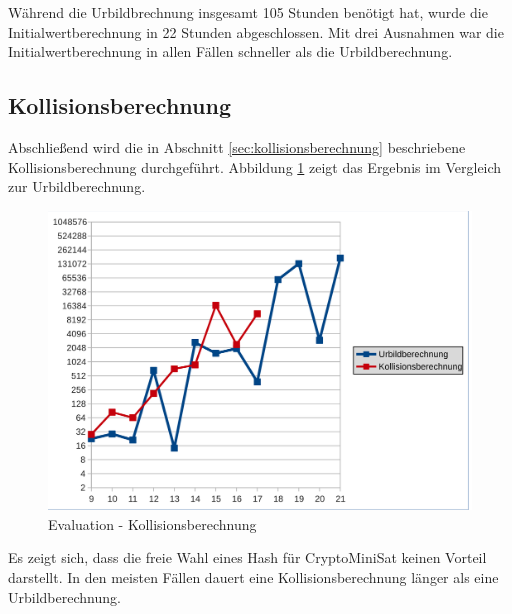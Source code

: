 Während die Urbildbrechnung insgesamt 105 Stunden benötigt hat, wurde die Initialwertberechnung in 22 Stunden
abgeschlossen. Mit drei Ausnahmen war die Initialwertberechnung in allen Fällen schneller als die Urbildberechnung.

\subsection{Kollisionsberechnung}
Abschließend wird die in Abschnitt \ref{sec:kollisionsberechnung} beschriebene Kollisionsberechnung durchgeführt.
Abbildung \ref{fig:eval_kollision} zeigt das Ergebnis im Vergleich zur Urbildberechnung.
\begin{figure}[!h]
  \centering
  \includegraphics[scale=0.55]{images/eval_kollision}
  \caption{Evaluation - Kollisionsberechnung}
  \label{fig:eval_kollision}
\end{figure}

Es zeigt sich, dass die freie Wahl eines Hash für CryptoMiniSat keinen Vorteil darstellt. In den meisten Fällen
dauert eine Kollisionsberechnung länger als eine Urbildberechnung. 